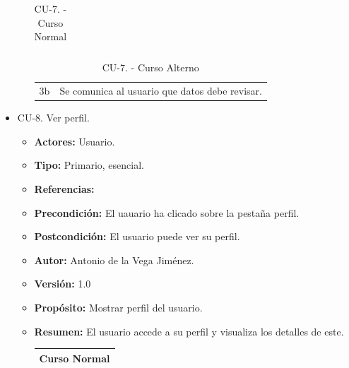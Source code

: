 \begin{itemize}
\begin{itemize}
\begin{table}[H]
\begin{tabularx}{\textwidth}{|l|X|l|X|}
      \end{tabularx}
      \caption{CU-7. - Curso Normal}
      \label{my-label}
    \end{table}
    \begin{table}[H]
      \centering
      \begin{tabularx}{\textwidth}{|l|X|}
       \hline
       \rowcolor[HTML]{C0C0C0} 
       \multicolumn{2}{|l|}{\cellcolor[HTML]{C0C0C0}Curso Alterno} \\ \hline
       \rowcolor[HTML]{FFFFFF} 
              3b                      & Se comunica al usuario que datos debe revisar.                            \\ \hline
      \end{tabularx}
      \caption{CU-7. - Curso Alterno}
      \label{my-label}
    \end{table}
  \end{itemize}
  \item CU-8. Ver perfil.
  \begin{itemize}
    \item \textbf{Actores:} Usuario.
    \item \textbf{Tipo:} Primario, esencial.
    \item \textbf{Referencias:}
    \item \textbf{Precondición:} El uauario ha clicado sobre la pestaña perfil.
    \item \textbf{Postcondición:} El usuario puede ver su perfil.
    \item \textbf{Autor:} Antonio de la Vega Jiménez.
    \item \textbf{Versión:} 1.0
    \item \textbf{Propósito:} Mostrar perfil del usuario.
    \item \textbf{Resumen:} El usuario accede a su perfil y visualiza los detalles de este.
    \begin{table}[H]
      \centering
      \begin{tabularx}{\textwidth}{|l|X|l|X|}
        \hline
        \multicolumn{4}{|c|}{\cellcolor[HTML]{C0C0C0}Curso Normal}                                                 \\ \hline

\end{tabularx}
\end{table}
\end{itemize}
\end{itemize}
